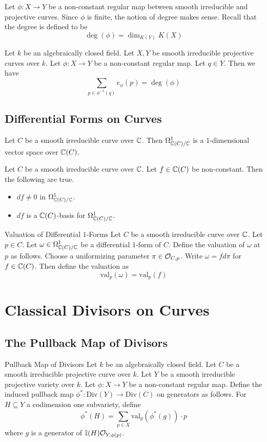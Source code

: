 \documentclass[a4paper]{article}
\begin{document}
Let $\phi:X\to Y$ be a non-constant regular map between smooth irreducible and projective curves. Since $\phi$ is finite, the notion of degree makes sense. Recall that the degree is defined to be $$\deg(\phi)=\dim_{K(Y)}K(X)$$

\begin{prp}{}{} Let $k$ be an algebraically closed field. Let $X,Y$ be smooth irreducible projective curves over $k$. Let $\phi:X\to Y$ be a non-constant regular map. Let $q\in Y$. Then we have $$\sum_{p\in\phi^{-1}(q)}e_\phi(p)=\deg(\phi)$$
\end{prp}

\subsection{Differential Forms on Curves}
\begin{prp}{}{} Let $C$ be a smooth irreducible curve over $\mathbb{C}$. Then $\Omega_{\mathbb{C}(C)/\mathbb{C}}^1$ is a $1$-dimensional vector space over $\mathbb{C}(C)$. 
\end{prp}

\begin{prp}{}{} Let $C$ be a smooth irreducible curve over $\mathbb{C}$. Let $f\in\mathbb{C}(C)$ be non-constant. Then the following are true. 
\begin{itemize}
\item $df\neq 0$ in $\Omega_{\mathbb{C}(C)/\mathbb{C}}^1$. 
\item $df$ is a $\mathbb{C}(C)$-basis for $\Omega_{\mathbb{C}(C)/\mathbb{C}}^1$. 
\end{itemize}
\end{prp}

\begin{defn}{Valuation of Differential $1$-Forms}{} Let $C$ be a smooth irreducible curve over $\mathbb{C}$. Let $p\in C$. Let $\omega\in\Omega_{\mathbb{C}(C)/\mathbb{C}}^1$ be a differential $1$-form of $C$. Define the valuation of $\omega$ at $p$ as follows. Choose a uniformizing parameter $\pi\in\mathcal{O}_{C,p}$. Write $\omega=fd\pi$ for $f\in\mathbb{C}(C)$. Then define the valuation as $$\text{val}_p(\omega)=\text{val}_p(f)$$
\end{defn}

\pagebreak
\section{Classical Divisors on Curves}
\subsection{The Pullback Map of Divisors}
\begin{defn}{Pullback Map of Divisors}{} Let $k$ be an algebraically closed field. Let $C$ be a smooth irreducible projective curve over $k$. Let $Y$ be a smooth irreducible projective variety over $k$. Let $\phi:X\to Y$ be a non-constant regular map. Define the induced pullback map $\phi^\ast:\text{Div}(Y)\to\text{Div}(C)$ on generators as follows. For $H\subseteq Y$ a codimension one subvariety, define $$\phi^\ast(H)=\sum_{p\in X}\text{val}_p(\phi^\ast(g))\cdot p$$ where $g$ is a generator of $\mathbb{I}(H)\mathcal{O}_{Y,\phi(p)}$. 
\end{defn}
\end{document}
